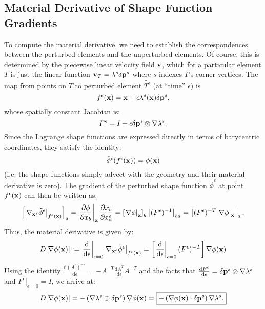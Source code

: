 \documentclass[10pt]{article}
\providecommand{\grad}{\nabla}
\providecommand{\pder}[2]{\frac{\partial #1}{\partial #2}}
\providecommand{\tder}[2]{\frac{\mathrm{d} #1}{\mathrm{d} #2}}
\providecommand{\evalat}[2]{\left.#1\right|_{#2}}
\providecommand{\MDer}[1]{D\!\left[#1\right]}
\def\x{{\bf x}}
\def\p{{\bf p}}
\def\v{{\bf v}}
\newcommand{\defeq}{\vcentcolon=}
\begin{document}
\begin{appendices}

\section{Material Derivative of Shape Function Gradients}
\label{sec:DSFGrad}
To compute the material derivative, we need to establish the correspondences
between the perturbed elements  and the unperturbed
elements. Of course, this is determined by the piecewise linear velocity field
$\v$, which for a particular element $T$ is just the linear function $\v_T =
\lambda^s \delta \p^s$ where $s$ indexes $T$'s corner vertices. The map from
points on $T$ to perturbed element $\tilde{T^\epsilon}$ (at ``time''
$\epsilon$) is
$$
f^\epsilon(\x) = \x + \epsilon \lambda^s(\x) \delta \p^s,
$$
whose spatially constant Jacobian is:
$$
F^\epsilon = I + \epsilon \delta \p^s \otimes \grad \lambda^s.
$$
Since the Lagrange shape functions are expressed directly in terms of barycentric
coordinates, they satisfy the identity:
$$
\tilde\phi^\epsilon (f^\epsilon(\x)) = \phi(\x)
$$
(i.e. the shape functions simply advect with the geometry and their material
derivative is zero).
The gradient of the perturbed shape function $\tilde \phi^\epsilon$ at point
$f^\epsilon(\x)$ can then be written as:
$$
\left[\evalat{\grad_{\x^\epsilon}\tilde \phi^\epsilon}{f^\epsilon(\x)}\right]_a =
\evalat{\pder{\phi}{x_b}}{\x} \pder{x_b}{x^\epsilon_a} =
\left[\evalat{\grad \phi}{\x}\right]_b \left[(F^\epsilon)^{-1}\right]_{ba} =
\left[(F^\epsilon)^{-T} \evalat{\grad \phi}{\x}\right]_a.
$$
Thus, the material derivative is given by:
$$
\MDer{\grad \phi(\x)} \defeq
  \evalat{\tder{}{\epsilon}}{\epsilon = 0}\evalat{\grad_{\x^\epsilon}\tilde \phi^\epsilon}{f^\epsilon(\x)}
  = \left[\evalat{\tder{}{\epsilon}}{\epsilon = 0}(F^\epsilon)^{-T}\right] \grad \phi(\x)
$$
Using the identity $\tder{(A^\epsilon)^{-T}}{\epsilon} = - A^{-T} \tder{A^T}{\epsilon} A^{-T}$
and the facts that $\tder{F^\epsilon}{\epsilon} = \delta \p^s \otimes \grad
\lambda^s$ and $\evalat{F^\epsilon}{\epsilon = 0} = I$, we arrive at:
$$
\MDer{\grad \phi(\x)} = -\left(\grad \lambda^s \otimes \delta \p^s\right) \grad \phi(\x)
=
\boxed{
    -\left(\grad \phi(\x) \cdot \delta \p^s\right) \grad \lambda^s.
}
$$

\end{appendices}
\end{document}
